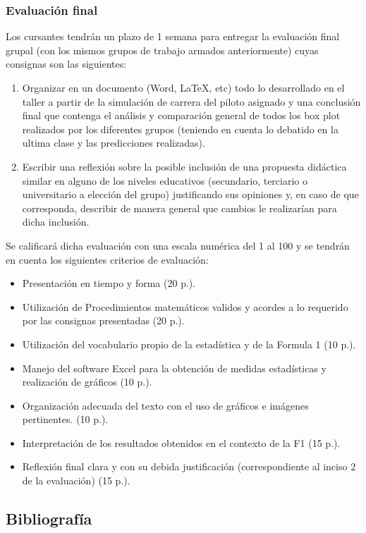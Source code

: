 \subsubsection{Evaluación final}

Los cursantes tendrán un plazo de 1 semana para entregar la evaluación final grupal (con los mismos grupos de trabajo armados anteriormente) cuyas consignas son las siguientes: 

\begin{enumerate}
	\item Organizar en un documento (Word, LaTeX, etc) todo lo desarrollado en el taller a partir de la simulación de carrera del piloto asignado y una conclusión final que contenga el análisis y comparación general de todos los box plot realizados por los diferentes grupos (teniendo en cuenta lo debatido en la ultima clase y las predicciones realizadas).
	
	\item Escribir una reflexión sobre la posible inclusión de una propuesta didáctica similar en alguno de los niveles educativos (secundario, terciario o universitario a elección del grupo) justificando sus opiniones y, en caso de que corresponda, describir de manera general que cambios le realizarían para dicha inclusión. 
\end{enumerate}

\noindent Se calificará dicha evaluación con una escala numérica del 1 al 100 y se tendrán en cuenta los siguientes criterios de evaluación:
\begin{itemize}
	\item Presentación en tiempo y forma (20 p.).
	\item Utilización de Procedimientos matemáticos validos y acordes a lo requerido por las consignas presentadas (20 p.).
	\item Utilización del vocabulario propio de la estadística y de la Formula 1 (10 p.).
	\item Manejo del software Excel para la obtención de medidas estadísticas y realización de gráficos (10 p.).
	\item Organización adecuada del texto con el uso de gráficos e imágenes pertinentes. (10 p.).
	\item Interpretación de los resultados obtenidos en el contexto de la F1 (15 p.).
	\item Reflexión final clara y con su debida justificación (correspondiente al inciso 2 de la evaluación) (15 p.).
\end{itemize}

\subsection{Bibliografía}

\nocite{*}
\printbibliography[keyword={01}]
